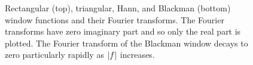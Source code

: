 {\begin{figure}[p]
\caption{Rectangular (top), triangular, Hann, and Blackman (bottom) window functions and their Fourier transforms. The Fourier transforms have zero imaginary part and so only the real part is plotted.  The Fourier transform of the Blackman window decays to zero particularly rapidly as $\left\vert f \right\vert$ increases.} \label{fig:windowfunctions}
\end{figure}
}



